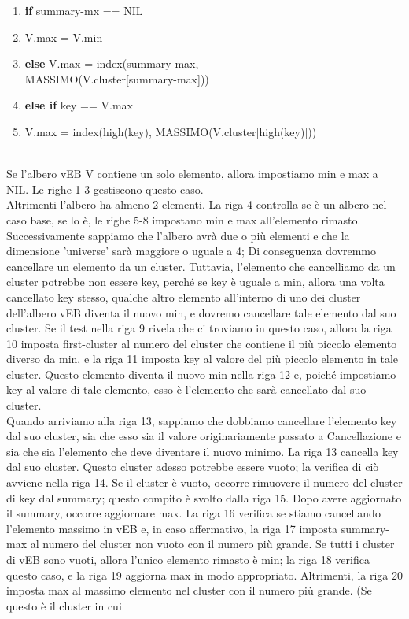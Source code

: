 \documentclass{article}
\begin{document}
\begin{flushleft}
\begin{enumerate}
                \item \hspace{60pt} \textbf{if} summary-mx == NIL
                \item \hspace{80pt} V.max = V.min
                \item \hspace{60pt} \textbf{else} V.max = index(summary-max,\\ 
                      \hspace{110pt} MASSIMO(V.cluster[summary-max]))
                \item \hspace{20pt} \textbf{else if} key == V.max
                \item \hspace{40pt} V.max = index(high(key), MASSIMO(V.cluster[high(key)]))
            \end{enumerate}
            ~\\Se l'albero vEB V contiene un solo elemento, allora impostiamo min e max a NIL. Le righe 1-3 gestiscono questo caso.\\
            Altrimenti l'albero ha almeno 2 elementi. La riga 4 controlla se è un albero nel caso base, se lo è, le righe 5-8 impostano min e max all'elemento rimasto.
            Successivamente sappiamo che l'albero avrà due o più elementi e che la dimensione 'universe' sarà maggiore o uguale a 4; Di conseguenza dovremmo cancellare un elemento da un cluster.
            Tuttavia, l'elemento che cancelliamo da un cluster potrebbe non essere key, perché se key è uguale a min, allora una volta cancellato key stesso, qualche altro elemento all'interno di uno dei cluster dell'albero vEB diventa il nuovo min, e dovremo cancellare tale elemento dal suo cluster. Se il test nella riga 9 rivela che ci troviamo in questo caso, allora la riga 10 imposta first-cluster al numero del cluster che contiene il più piccolo elemento diverso da min, e la riga 11 imposta key al valore del più piccolo elemento in tale cluster.
            Questo elemento diventa il nuovo min nella riga 12 e, poiché impostiamo key al valore di tale elemento, esso è l'elemento che sarà cancellato dal suo cluster.\\
            Quando arriviamo alla riga 13, sappiamo che dobbiamo cancellare l'elemento key dal suo cluster, sia che esso sia il valore originariamente passato a Cancellazione e sia che sia l'elemento che deve diventare il nuovo minimo. La riga 13 cancella key dal suo cluster. Questo cluster adesso potrebbe essere vuoto; la          verifica di ciò avviene nella riga 14. Se il cluster è vuoto, occorre rimuovere il numero del cluster di key dal summary; questo compito è svolto dalla riga 15. Dopo avere aggiornato il summary, occorre aggiornare max. La riga 16 verifica se stiamo cancellando l'elemento massimo in vEB e, in caso affermativo, la riga 17 imposta summary-max al numero del cluster non vuoto con il numero più grande. Se tutti i cluster di vEB sono vuoti, allora l'unico elemento rimasto è min; la riga 18 verifica questo caso, e la riga 19 aggiorna max in modo appropriato. Altrimenti, la riga 20 imposta max al massimo elemento nel cluster con il numero più grande. (Se questo è il cluster in cui

\end{flushleft}
\end{document}
